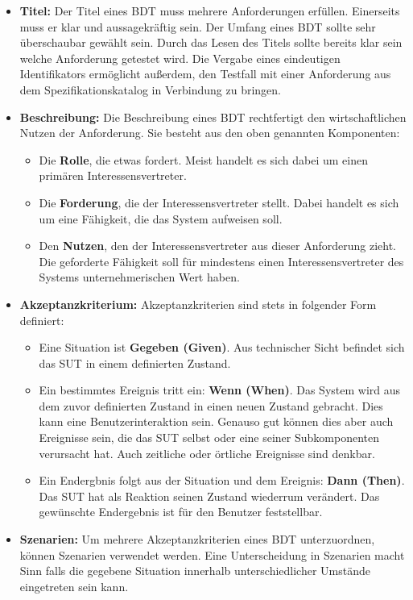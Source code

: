 \begin{itemize}
\item \textbf{Titel:} Der Titel eines \Gls{BDT} muss mehrere Anforderungen erfüllen. Einerseits muss er klar und aussagekräftig sein. Der Umfang eines \Gls{BDT} sollte sehr überschaubar gewählt sein. Durch das Lesen des Titels sollte bereits klar sein welche Anforderung getestet wird. Die Vergabe eines eindeutigen Identifikators ermöglicht außerdem, den Testfall mit einer Anforderung aus dem Spezifikationskatalog in Verbindung zu bringen.
\item \textbf{Beschreibung:} Die Beschreibung eines \Gls{BDT} rechtfertigt den wirtschaftlichen Nutzen der Anforderung. Sie besteht aus den oben genannten Komponenten:

\begin{itemize}
\item Die \textbf{Rolle}, die etwas fordert. Meist handelt es sich dabei um einen primären Interessensvertreter.
\item Die \textbf{Forderung}, die der Interessensvertreter stellt. Dabei handelt es sich um eine Fähigkeit, die das System aufweisen soll.
\item Den \textbf{Nutzen}, den der Interessensvertreter aus dieser Anforderung zieht. Die geforderte Fähigkeit soll für mindestens einen Interessensvertreter des Systems unternehmerischen Wert haben.
\end{itemize}

\item \textbf{Akzeptanzkriterium:} Akzeptanzkriterien sind stets in folgender Form definiert:
\begin{itemize}
\item Eine Situation ist \textbf{Gegeben (Given)}. Aus technischer Sicht befindet sich das \Gls{SUT} in einem definierten Zustand.
\item Ein bestimmtes Ereignis tritt ein: \textbf{Wenn (When)}. Das System wird aus dem zuvor definierten Zustand in einen neuen Zustand gebracht. Dies kann eine Benutzerinteraktion sein. Genauso gut können dies aber auch Ereignisse sein, die das \Gls{SUT} selbst oder eine seiner Subkomponenten verursacht hat. Auch zeitliche oder örtliche Ereignisse sind denkbar.
\item Ein Endergbnis folgt aus der Situation und dem Ereignis: \textbf{Dann (Then)}. Das \Gls{SUT} hat als Reaktion seinen Zustand wiederrum verändert. Das gewünschte Endergebnis ist für den Benutzer feststellbar.
\end{itemize}

\item \textbf{Szenarien:} Um mehrere Akzeptanzkriterien eines \Gls{BDT} unterzuordnen, können Szenarien verwendet werden. Eine Unterscheidung in Szenarien macht Sinn falls die gegebene Situation innerhalb unterschiedlicher Umstände eingetreten sein kann.
\end{itemize}

